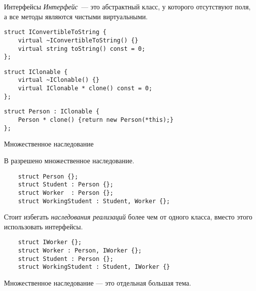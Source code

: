 \documentclass{beamer}
\begin{document}
\begin{frame}[fragile]{Интерфейсы}{}
    {\em Интерфейс}~— это абстрактный класс, у которого отсутствуют поля,
    а все методы являются чистыми виртуальными.

    \begin{lstlisting}
struct IConvertibleToString {
    virtual ~IConvertibleToString() {}
    virtual string toString() const = 0;
};
    \end{lstlisting}
    \begin{lstlisting}
struct IClonable {
    virtual ~IClonable() {}
    virtual IClonable * clone() const = 0;
};
    \end{lstlisting}
    \begin{lstlisting}
struct Person : IClonable {
    Person * clone() {return new Person(*this);}
};
    \end{lstlisting}
\end{frame}

\begin{frame}[fragile]{Множественное наследование}

    В \langcpp разрешено множественное наследование.
\begin{lstlisting}
    struct Person {};
    struct Student : Person {};
    struct Worker  : Person {};
    struct WorkingStudent : Student, Worker {};
\end{lstlisting}
    Стоит избегать {\em наследования реализаций} более чем от одного 
    класса, вместо этого использовать интерфейсы.

\begin{lstlisting}
    struct IWorker {};
    struct Worker : Person, IWorker {};
    struct Student : Person {};
    struct WorkingStudent : Student, IWorker {}
\end{lstlisting}

Множественное наследование — это отдельная большая тема.
\end{frame}
\end{document}
